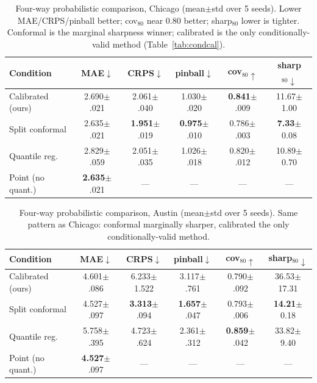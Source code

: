 \documentclass[11pt,conference]{IEEEtran}
\begin{document}
\begin{table}[t]
\centering
\caption{Four-way probabilistic comparison, Chicago (mean$\pm$std over 5 seeds).
Lower MAE/CRPS/pinball better; cov$_{80}$ near 0.80 better; sharp$_{80}$ lower
is tighter. Conformal is the marginal sharpness winner; calibrated is the only
conditionally-valid method (Table~\ref{tab:condcal}).}
\label{tab:probbase_chi}
\small
\begin{tabular}{lccccc}
\toprule
Condition & MAE$\downarrow$ & CRPS$\downarrow$ & pinball$\downarrow$ & cov$_{80}\uparrow$ & sharp$_{80}\downarrow$\\
\midrule
Calibrated (ours) & 2.690$\pm$.021 & 2.061$\pm$.040 & 1.030$\pm$.020 & \textbf{0.841}$\pm$.009 & 11.67$\pm$1.00\\
Split conformal   & 2.635$\pm$.021 & \textbf{1.951}$\pm$.019 & \textbf{0.975}$\pm$.010 & 0.786$\pm$.003 & \textbf{7.33}$\pm$0.08\\
Quantile reg.      & 2.829$\pm$.059 & 2.051$\pm$.035 & 1.026$\pm$.018 & 0.820$\pm$.012 & 10.89$\pm$0.70\\
Point (no quant.)  & \textbf{2.635}$\pm$.021 & --- & --- & --- & ---\\
\bottomrule
\end{tabular}
\end{table}

\begin{table}[t]
\centering
\caption{Four-way probabilistic comparison, Austin (mean$\pm$std over 5 seeds).
Same pattern as Chicago: conformal marginally sharper, calibrated the only
conditionally-valid method.}
\label{tab:probbase_aus}
\small
\begin{tabular}{lccccc}
\toprule
Condition & MAE$\downarrow$ & CRPS$\downarrow$ & pinball$\downarrow$ & cov$_{80}\uparrow$ & sharp$_{80}\downarrow$\\
\midrule
Calibrated (ours) & 4.601$\pm$.086 & 6.233$\pm$1.522 & 3.117$\pm$.761 & 0.790$\pm$.092 & 36.53$\pm$17.31\\
Split conformal   & 4.527$\pm$.097 & \textbf{3.313}$\pm$.094 & \textbf{1.657}$\pm$.047 & 0.793$\pm$.006 & \textbf{14.21}$\pm$0.18\\
Quantile reg.      & 5.758$\pm$.395 & 4.723$\pm$.624 & 2.361$\pm$.312 & \textbf{0.859}$\pm$.042 & 33.82$\pm$9.40\\
Point (no quant.)  & \textbf{4.527}$\pm$.097 & --- & --- & --- & ---\\
\bottomrule
\end{tabular}
\end{table}
\end{document}
